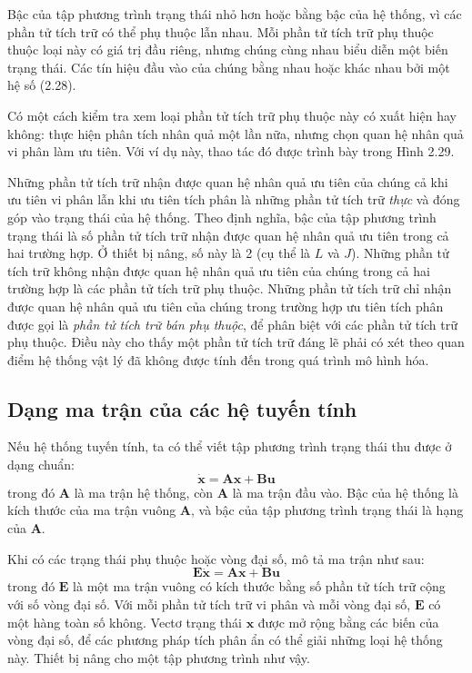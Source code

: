 Bậc của tập phương trình trạng thái nhỏ hơn hoặc bằng bậc của hệ thống, vì các phần tử tích trữ có thể phụ thuộc lẫn nhau. Mỗi phần tử tích trữ phụ thuộc thuộc loại này có giá trị đầu riêng, nhưng chúng cùng nhau biểu diễn một biến trạng thái. Các tín hiệu đầu vào của chúng bằng nhau hoặc khác nhau bởi một hệ số (2.28).

Có một cách kiểm tra xem loại phần tử tích trữ phụ thuộc này có xuất hiện hay không: thực hiện phân tích nhân quả một lần nữa, nhưng chọn quan hệ nhân quả vi phân làm ưu tiên. Với ví dụ này, thao tác đó được trình bày trong Hình 2.29.

Những phần tử tích trữ nhận được quan hệ nhân quả ưu tiên của chúng cả khi ưu tiên vi phân lẫn khi ưu tiên tích phân là những phần tử tích trữ \emph{thực} và đóng góp vào trạng thái của hệ thống. Theo định nghĩa, bậc của tập phương trình trạng thái là số phần tử tích trữ nhận được quan hệ nhân quả ưu tiên trong cả hai trường hợp. Ở
thiết bị nâng, số này là 2 (cụ thể là $L$ và $J$). Những phần tử tích trữ không nhận được quan hệ nhân quả ưu tiên của chúng trong cả hai trường hợp là các phần tử tích trữ phụ thuộc. Những phần tử tích trữ chỉ nhận được quan hệ nhân quả ưu tiên của chúng trong trường hợp ưu tiên tích phân được gọi là \emph{phần tử tích trữ bán phụ thuộc}, để phân biệt với các phần tử tích trữ phụ thuộc. Điều này cho thấy một phần tử tích trữ đáng lẽ phải có xét theo quan điểm hệ thống vật lý đã không được tính đến trong quá trình mô hình hóa.

\subsection{Dạng ma trận của các hệ tuyến tính}
Nếu hệ thống tuyến tính, ta có thể viết tập phương trình trạng thái thu được ở dạng chuẩn:
\[\dot{\mathbf{x}}=\mathbf{A}\mathbf{x}+\mathbf{B}\mathbf{u}\]
trong đó $\mathbf{A}$ là ma trận hệ thống, còn $\mathbf{A}$ là ma trận đầu vào. Bậc của hệ thống là kích thước của ma trận vuông $\mathbf{A}$, và bậc của tập phương trình trạng thái là hạng của $\mathbf{A}$.

Khi có các trạng thái phụ thuộc hoặc vòng đại số, mô tả ma trận như sau:
\[\mathbf{E}\dot{\mathbf{x}}=\mathbf{A}\mathbf{x}+\mathbf{B}\mathbf{u}\]
trong đó $\mathbf{E}$ là một ma trận vuông có kích thước bằng số phần tử tích trữ cộng với số vòng đại số. Với mỗi phần tử tích trữ vi phân và mỗi vòng đại số, $\mathbf{E}$ có một hàng toàn số không. Vectơ trạng thái $\mathbf{x}$ được mở rộng bằng các biến của vòng đại số, để các phương pháp tích phân ẩn có thể giải những loại hệ thống này. Thiết bị nâng cho một tập phương trình như vậy.
